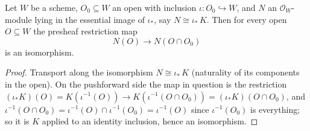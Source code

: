 \begin{lemma}\leanok
  \label{lem:restrictionMap_isIso_of_essImage}
  Let \(W\) be a scheme, \(O_0 \subseteq W\) an open with inclusion \(\iota : O_0 \hookrightarrow
  W\), and \(N\) an \(\mathcal{O}_W\)-module lying in the essential image of \(\iota_*\), say
  \(N \cong \iota_*\,K\).  Then for every open \(O \subseteq W\) the presheaf restriction map
  \[
    N(O) \longrightarrow N(O \cap O_0)
  \]
  is an isomorphism.
\end{lemma}
\begin{proof}\leanok
  Transport along the isomorphism \(N \cong \iota_*\,K\) (naturality of its components in the
  open).  On the pushforward side the map in question is the restriction
  \((\iota_*K)(O) = K(\iota^{-1}(O)) \to K(\iota^{-1}(O \cap O_0)) = (\iota_*K)(O \cap O_0)\),
  and \(\iota^{-1}(O \cap O_0) = \iota^{-1}(O) \cap \iota^{-1}(O_0) = \iota^{-1}(O)\) since
  \(\iota^{-1}(O_0)\) is everything; so it is \(K\) applied to an identity inclusion, hence an
  isomorphism.
\end{proof}

